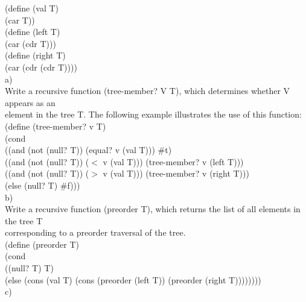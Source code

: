 \documentclass[12pt]{article}
\begin{document}
\begin{flushleft}
\qquad \qquad \qquad (define (val T)\\
\qquad \qquad \qquad \qquad (car T))\\
[2mm]

\qquad \qquad \qquad (define (left T)\\
\qquad \qquad \qquad \qquad (car (cdr T)))\\
[2mm]

\qquad \qquad \qquad (define (right T)\\
\qquad \qquad \qquad \qquad (car (cdr (cdr T))))\\
[2mm]

\qquad a)\\
\qquad \qquad 
Write a recursive function (tree-member? V T), which determines whether V appears  as an\\ 
\qquad \qquad  element in the tree T.  The following example illustrates the use of this function:\\ 
[2mm]

\qquad \qquad \qquad (define (tree-member? v T)\\
\qquad \qquad \qquad \qquad (cond\\
\qquad \qquad \qquad \qquad \qquad ((and (not (null? T)) (equal? v (val T))) \#t)\\
\qquad \qquad \qquad \qquad \qquad ((and (not (null? T)) ($<$ v (val T))) (tree-member? v (left T)))\\
\qquad \qquad \qquad \qquad \qquad ((and (not (null? T)) ($>$ v (val T))) (tree-member? v (right T)))\\
\qquad \qquad \qquad \qquad \qquad (else (null? T) \#f)))\\
[2mm]

\qquad b)\\
 
\qquad \qquad Write a recursive function (preorder T), which returns the list of all elements in the tree T\\
\qquad \qquad corresponding to a preorder traversal of the tree.\\
[2mm]

\qquad \qquad \qquad  (define (preorder T)\\
\qquad \qquad \qquad \qquad (cond\\
\qquad \qquad \qquad \qquad \qquad ((null? T) T)\\ 
\qquad \qquad \qquad \qquad \qquad (else (cons (val T) (cons (preorder (left T)) (preorder (right T))))))))\\

\qquad c)\\


\end{flushleft}
\end{document}
